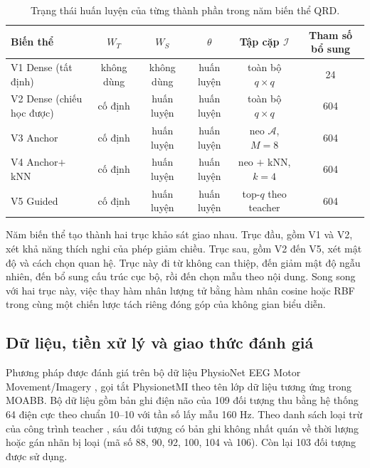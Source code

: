 \begin{table}[!htbp]
\centering
\caption{Trạng thái huấn luyện của từng thành phần trong năm biến thể QRD.}
\label{tab:bienthe_cauhinh}
\small
\begin{tabular}{lccccc}
\toprule
\textbf{Biến thể} & $W_T$ & $W_S$ & $\theta$ & Tập cặp $\mathcal{I}$ & Tham số bổ sung \\
\midrule
V1 Dense (tất định) & không dùng & không dùng & huấn luyện & toàn bộ $q\times q$ & 24 \\
V2 Dense (chiếu học được) & cố định & huấn luyện & huấn luyện & toàn bộ $q\times q$ & 604 \\
V3 Anchor & cố định & huấn luyện & huấn luyện & neo $\mathcal{A}$, $M{=}8$ & 604 \\
V4 Anchor$+$kNN & cố định & huấn luyện & huấn luyện & neo $+$ kNN, $k{=}4$ & 604 \\
V5 Guided & cố định & huấn luyện & huấn luyện & top-$q$ theo teacher & 604 \\
\bottomrule
\end{tabular}
\end{table}
\FloatBarrier

Năm biến thể tạo thành hai trục khảo sát giao nhau. Trục đầu, gồm V1 và V2, xét khả năng thích nghi của phép giảm chiều. Trục sau, gồm V2 đến V5, xét mật độ và cách chọn quan hệ. Trục này đi từ không can thiệp, đến giảm mật độ ngẫu
nhiên, đến bổ sung cấu trúc cục bộ, rồi đến chọn mẫu theo nội dung. Song song
với hai trục này, việc thay hàm nhân lượng tử bằng hàm nhân cosine hoặc RBF
trong cùng một chiến lược tách riêng đóng góp của không gian biểu diễn.

\subsection{Dữ liệu, tiền xử lý và giao thức đánh giá}
\label{sec:dulieu}

Phương pháp được đánh giá trên bộ dữ liệu PhysioNet EEG Motor
Movement/Imagery \cite{schalk2004bci2000, goldberger2000physiobank}, gọi tắt
PhysionetMI theo tên lớp dữ liệu tương ứng trong MOABB. Bộ dữ liệu gồm bản
ghi điện não của 109 đối tượng thu bằng hệ thống 64 điện cực theo chuẩn
10--10 với tần số lấy mẫu 160 Hz. Theo danh sách loại trừ của công trình
teacher \cite{zoumpourlis2024motor}, sáu đối tượng có bản ghi không nhất
quán về thời lượng hoặc gán nhãn bị loại (mã số 88, 90, 92, 100, 104 và
106). Còn
lại 103 đối tượng được sử dụng.

